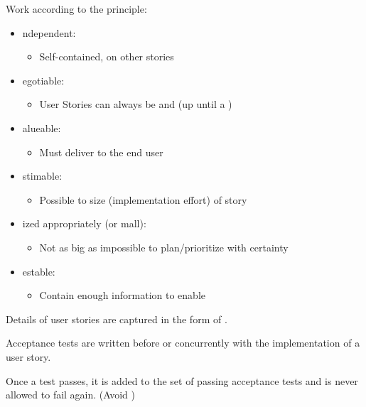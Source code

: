\documentclass[
    ../../Software_Engineering_Summary.tex,
]
{subfiles}
\begin{document}
\begin{defbox}
    Work according to the  principle:
    \begin{itemize}
        \item {}ndependent:
        \begin{itemize}
            \item Self-contained,  on other stories
        \end{itemize}
        \item {}egotiable:
        \begin{itemize}
            \item User Stories can always be  and  (up until a )
        \end{itemize}
        \item {}alueable:
        \begin{itemize}
            \item Must deliver  to the end user
        \end{itemize}
        \item {}stimable:
        \begin{itemize}
            \item Possible to  size (implementation effort) of story
        \end{itemize}
        \item {}ized appropriately (or mall):
        \begin{itemize}
            \item Not as big as impossible to plan/prioritize with certainty
        \end{itemize}
        \item {}estable:
        \begin{itemize}
            \item Contain enough information to enable 
        \end{itemize}
    \end{itemize}
\end{defbox}

\begin{defbox}
    Details of user stories are captured in the form of .

    Acceptance tests are written before or concurrently with the implementation of a user story.

    Once a test passes, it is added to the set of passing acceptance tests and is never allowed to fail again. (Avoid )
\end{defbox}
\end{document}
